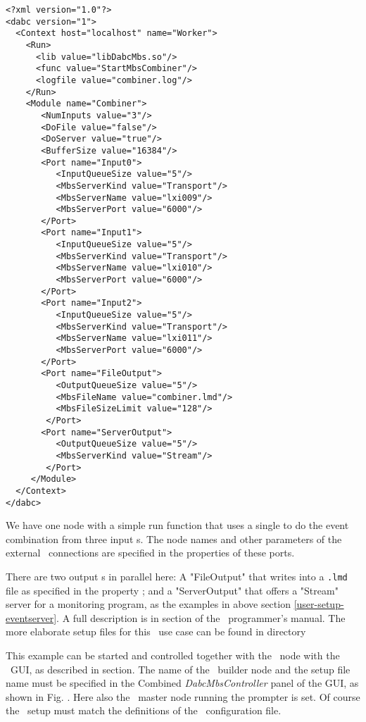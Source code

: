 \begin{small}
\begin{verbatim}
<?xml version="1.0"?>
<dabc version="1">
  <Context host="localhost" name="Worker">
    <Run>
      <lib value="libDabcMbs.so"/>
      <func value="StartMbsCombiner"/>
      <logfile value="combiner.log"/>
    </Run>
    <Module name="Combiner">
       <NumInputs value="3"/>
       <DoFile value="false"/>
       <DoServer value="true"/>
       <BufferSize value="16384"/>
       <Port name="Input0">
          <InputQueueSize value="5"/>
          <MbsServerKind value="Transport"/>
          <MbsServerName value="lxi009"/>
          <MbsServerPort value="6000"/>
       </Port>
       <Port name="Input1">
          <InputQueueSize value="5"/>
          <MbsServerKind value="Transport"/>
          <MbsServerName value="lxi010"/>
          <MbsServerPort value="6000"/>
       </Port>
       <Port name="Input2">
          <InputQueueSize value="5"/>
          <MbsServerKind value="Transport"/>
          <MbsServerName value="lxi011"/>
          <MbsServerPort value="6000"/>
       </Port>
       <Port name="FileOutput">
          <OutputQueueSize value="5"/>
          <MbsFileName value="combiner.lmd"/>
          <MbsFileSizeLimit value="128"/>
        </Port>
       <Port name="ServerOutput">
          <OutputQueueSize value="5"/>
          <MbsServerKind value="Stream"/>
        </Port>
     </Module>
  </Context>
</dabc>
\end{verbatim}
\end{small}

We have one node  with a simple run function 
 that uses a single  to do the
event combination from three input s.
The node names and other parameters of the external \mbs\ connections
are specified in the  properties of these ports.

There are two output s in parallel here: A "FileOutput"
that writes into a {\tt *.lmd} file as specified in the property 
; and a "ServerOutput" that offers a "Stream" server
for a monitoring program, as the examples in above section \ref{user-setup-eventserver}.
A full description is in section
 of the \dabc\ programmer's manual.
The more elaborate setup files for this \mbs\ use case can be found 
in directory

This example can be started and controlled together with the \mbs\ node
with the \dabc\ GUI, as described in section. 
The name of the \dabc\ builder  node and
the setup file name must be specified in the 
Combined {\em DabcMbsController} panel of the GUI, as shown in
Fig. . Here also the \mbs\
master node running the prompter is set. Of course the \mbs\ setup
must match the \keyw{<MbsServerName>} definitions 
of the \dabc\ configuration file.


